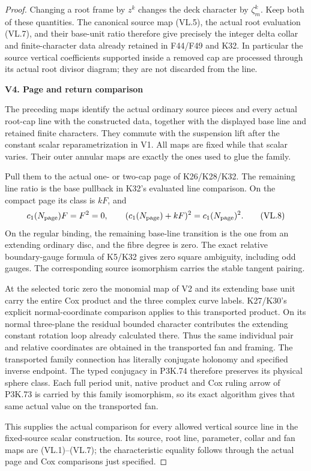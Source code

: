 \begin{proof}
Changing a root frame by \(z^k\) changes the deck
character by \(\zeta_m^k\). Keep both of these
quantities. The canonical source map (VL.5), the
actual root evaluation (VL.7), and their base-unit
ratio therefore give precisely the integer delta
collar and finite-character data already retained
in F44/F49 and K32. In particular the source
vertical coefficients supported inside a removed
cap are processed through its actual root divisor
diagram; they are not discarded from the line.

\par

\medskip\noindent\textbf{V4. Page and return comparison}

\par\nobreak

The preceding maps identify the actual ordinary
source pieces and every actual root-cap line with
the constructed data, together with the displayed
base line and retained finite characters. They
commute with the suspension lift after the constant
scalar reparametrization in V1. All maps are fixed
while that scalar varies. Their outer annular
maps are exactly the ones used to glue the family.

Pull them to the actual one- or two-cap page of
K26/K28/K32. The remaining line ratio is the base
pullback in K32's evaluated line comparison. On
the compact page its class is \(kF\), and
\[
 c_1(N_{\rm page})F=F^2=0,\qquad
 (c_1(N_{\rm page})+kF)^2=c_1(N_{\rm page})^2 .
 \tag{VL.8}
\]
On the regular binding, the remaining base-line
transition is the one from an extending ordinary
disc, and the fibre degree is zero. The exact
relative boundary-gauge formula of K5/K32 gives
zero square ambiguity, including odd gauges.
The corresponding source isomorphism carries
the stable tangent pairing.

At the selected toric zero the monomial map of V2
and its extending base unit carry the entire Cox
product and the three complex curve labels. K27/K30's
explicit normal-coordinate comparison applies to
this transported product. On its normal three-plane
the residual bounded character contributes the
extending constant rotation loop already calculated
there. Thus the same individual pair and relative
coordinates are obtained in the transported fan
and framing. The transported family connection has literally conjugate holonomy
and specified inverse endpoint. The typed conjugacy in P3K.74
therefore preserves its physical sphere class. Each full period
unit, native product and Cox ruling arrow of P3K.73 is carried by
this family isomorphism, so its exact algorithm gives that same
actual value on the transported fan.

This supplies the actual comparison for every
allowed vertical source line in the fixed-source
scalar construction. Its source, root line,
parameter, collar and fan maps are (VL.1)--(VL.7);
the characteristic equality follows through the
actual page and Cox comparisons just specified.
\end{proof}
